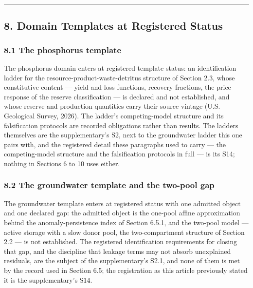 \documentclass[11pt]{article}
\begin{document}
\begin{center}\rule{0.5\linewidth}{0.5pt}\end{center}

\subsection{8. Domain Templates at Registered
Status}\label{domain-templates-at-registered-status}

\subsubsection{8.1 The phosphorus
template}\label{the-phosphorus-template}

The phosphorus domain enters at registered template status: an identification ladder for the
resource-product-waste-detritus structure of Section 2.3, whose constitutive content --- yield and loss
functions, recovery fractions, the price response of the reserve classification --- is declared and not
established, and whose reserve and production quantities carry their source vintage (U.S. Geological Survey,
2026). The ladder's competing-model structure and its falsification protocols are recorded obligations rather
than results. The ladders themselves are the supplementary's S2, next to the groundwater ladder this one pairs
with, and the registered detail these paragraphs used to carry --- the competing-model structure and the
falsification protocols in full --- is its S14; nothing in Sections 6 to 10 uses either.

\subsubsection{8.2 The groundwater template and the two-pool
gap}\label{the-groundwater-template-and-the-two-pool-gap}

The groundwater template enters at registered status with one admitted object and one declared gap: the
admitted object is the one-pool affine approximation behind the anomaly-persistence index of Section 6.5.1, and
the two-pool model --- active storage with a slow donor pool, the two-compartment structure of Section 2.2 ---
is not established. The registered identification requirements for closing that gap, and the discipline that
leakage terms may not absorb unexplained residuals, are the subject of the supplementary's S2.1, and none of
them is met by the record used in Section 6.5; the registration as this article previously stated it is the
supplementary's S14.
\end{document}
